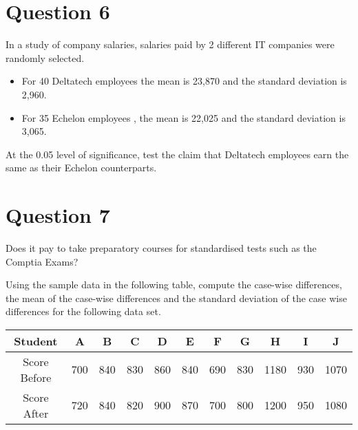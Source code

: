 


\section*{Question 6}

In a study of company salaries, salaries paid by 2 different IT companies were randomly selected.
\begin{itemize}
\item For 40 Deltatech employees the mean is 23,870 and the standard deviation is 2,960. 
\item For 35 Echelon employees , the mean is 22,025 and the standard deviation is 3,065.
\end{itemize} 

At the 0.05 level of significance, test the claim that Deltatech employees earn the same as their Echelon counterparts.
\section*{Question 7}
Does it pay to take preparatory courses for standardised tests such as the Comptia Exams? 

Using the sample data in the following table, compute the case-wise differences, the mean of the case-wise differences and the standard deviation of the case wise differences for the following data set.

\begin{center}
\begin{tabular}{|c|c|c|c|c|c|c|c|c|c|c|}
\hline  
Student	&	A	&	B	&	C	&	D	&	E	&	F	&	G	&	H	&	I	&	J	\\ \hline
Score Before	&	700	&	840	&	830	&	860	&	840	&	690	&	830	&	1180	&	930	&	1070	\\ \hline
Score After	&	720	&	840	&	820	&	900	&	870	&	700	&	800	&	1200	&	950	&	1080	\\ \hline
\end{tabular} 
\end{center}

